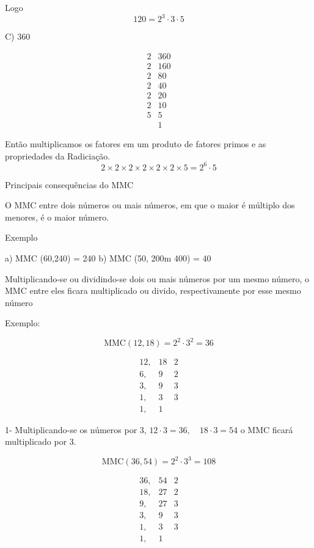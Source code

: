 \documentclass[letterpaper]{book}
\begin{document}
Logo \[120 = 2^{3} \cdot 3 \cdot 5\]

C) 360

\[
\begin{array}{c|ccc}
2 & 360 \\
\hline
2 & 160 \\
2 & 80 \\
2 & 40  \\
2 & 20 \\
2 & 10 \\
5 & 5  \\
  & 1
\end{array}
\]

Então multiplicamos os fatores em um produto de fatores primos e as propriedades da Radiciação. \[2 \times 2 \times 2 \times 2 \times 2 \times 2 \times 5 = 2^{6} \cdot 5\]

Principais consequências do MMC

O MMC entre dois números ou mais números, em que o maior é múltiplo dos menores, é o maior número.

Exemplo

a) MMC (60,240) = 240
b) MMC (50, 200m 400) = 40

Multiplicando-se ou dividindo-se dois ou mais números por um mesmo número, o MMC entre eles ficara multiplicado ou divido, respectivamente por esse mesmo número

Exemplo:

\[\text{MMC} (12,18) = 2^{2} \cdot 3^{2} =36\]

\[
\begin{array}{cc|cc}
12, & 18 & 2 \\
6,  &  9 & 2 \\
3,  &  9 & 3 \\  
1,  &  3 & 3 \\
1,  &  1 
\end{array}
\]

1- Multiplicando-se os números por 3, $12 \cdot 3 = 36, \quad 18 \cdot 3 = 54$ o MMC ficará multiplicado por 3.

\[\text{MMC} (36,54) = 2^{2} \cdot 3^{3}= 108\]

\[
\begin{array}{cc|cc}
36, & 54  & 2 \\
18, & 27  & 2 \\
9,  & 27  & 3 \\  
3,  &  9  & 3 \\
1,  &  3  & 3 \\
1,  &   1
\end{array}
\]
\end{document}
